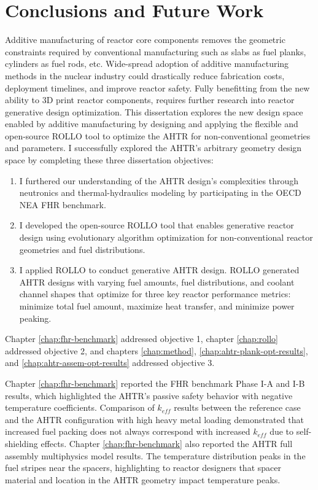 \chapter{Conclusions and Future Work}
\glsresetall
\label{chap:concl}

Additive manufacturing of reactor core components removes the geometric constraints
required by conventional manufacturing such as slabs as fuel planks, cylinders as 
fuel rods, etc. 
Wide-spread adoption of additive manufacturing methods in the nuclear industry 
could drastically reduce fabrication costs, deployment timelines, and improve reactor 
safety. 
Fully benefitting from the new ability to 3D print reactor components, requires further 
research into reactor generative design optimization. 
This dissertation explores the new design space enabled by additive manufacturing 
by designing and applying the flexible and open-source \gls{ROLLO} tool to optimize 
the \gls{AHTR} for non-conventional geometries and parameters. 
I successfully explored the \gls{AHTR}'s arbitrary geometry design space by completing 
these three dissertation objectives: 
\begin{enumerate}
    \item I furthered our understanding of the \gls{AHTR} design's complexities 
    through neutronics and thermal-hydraulics modeling by participating in the 
    \gls{OECD} \gls{NEA} \gls{FHR} benchmark.
    \item I developed the open-source \gls{ROLLO} tool that enables generative reactor 
    design using evolutionary algorithm optimization for non-conventional reactor 
    geometries and fuel distributions.
    \item I applied \gls{ROLLO} to conduct generative \gls{AHTR} design.
    \gls{ROLLO} generated \gls{AHTR} designs with varying fuel amounts, fuel 
    distributions, and coolant channel shapes that optimize for three key reactor 
    performance metrics: minimize total fuel amount, maximize heat transfer, and 
    minimize power peaking.
\end{enumerate}
Chapter \ref{chap:fhr-benchmark} addressed objective 1, chapter \ref{chap:rollo} 
addressed objective 2, and chapters \ref{chap:method}, \ref{chap:ahtr-plank-opt-results}, 
and \ref{chap:ahtr-assem-opt-results} addressed objective 3. 

Chapter \ref{chap:fhr-benchmark} reported the \gls{FHR} benchmark Phase I-A and I-B 
results, which highlighted the \gls{AHTR}'s passive safety behavior with 
negative temperature coefficients. 
Comparison of $k_{eff}$ results between the reference case and the \gls{AHTR} 
configuration with high heavy metal loading demonstrated that increased fuel 
packing does not always correspond with increased $k_{eff}$ due to self-shielding 
effects.
Chapter \ref{chap:fhr-benchmark} also reported the \gls{AHTR} full assembly 
multiphysics model results. The temperature distribution peaks in the fuel stripes near 
the spacers, highlighting to reactor designers that spacer material and location in the 
\gls{AHTR} geometry impact temperature peaks.  

